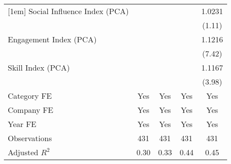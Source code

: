 {\begin{tabular}{l*{4}{c}}
[1em]
Social Influence Index (PCA)       &                     &                     &                     &      1.0231         \\
                                   &                     &                     &                     &      (1.11)         \\
[1em]
Engagement Index (PCA)             &                     &                     &                     &      1.1216\sym{***}\\
                                   &                     &                     &                     &      (7.42)         \\
[1em]
Skill Index (PCA)                  &                     &                     &                     &      1.1167\sym{***}\\
                                   &                     &                     &                     &      (3.98)         \\
[1em]
Category FE                        &         Yes         &         Yes         &         Yes         &         Yes         \\
[1em]
Company FE                         &         Yes         &         Yes         &         Yes         &         Yes         \\
[1em]
Year FE                            &         Yes         &         Yes         &         Yes         &         Yes         \\
\hline
Observations                       &         431         &         431         &         431         &         431         \\
Adjusted \(R^{2}\)                 &        0.30         &        0.33         &        0.44         &        0.45         \\
\hline\hline
\end{tabular}
}

